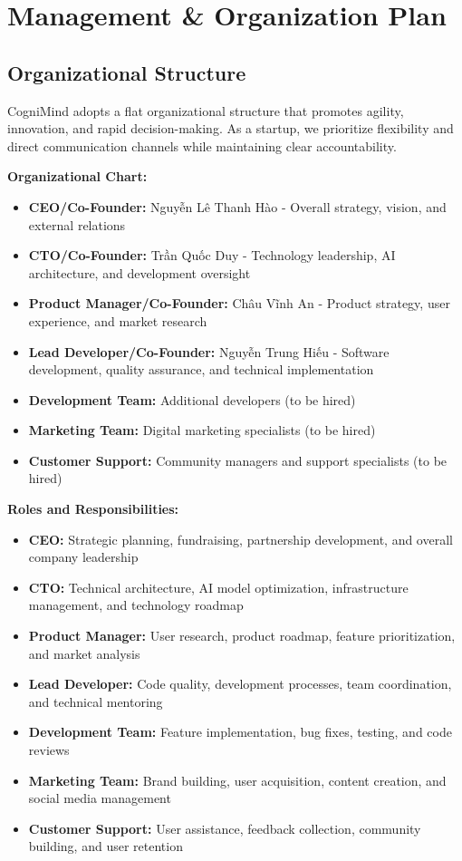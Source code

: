 \section{Management \& Organization Plan}

\subsection{Organizational Structure}
CogniMind adopts a flat organizational structure that promotes agility, innovation, and rapid decision-making. As a startup, we prioritize flexibility and direct communication channels while maintaining clear accountability.

\textbf{Organizational Chart:}
\begin{itemize}
    \item \textbf{CEO/Co-Founder:} Nguyễn Lê Thanh Hào - Overall strategy, vision, and external relations
    \item \textbf{CTO/Co-Founder:} Trần Quốc Duy - Technology leadership, AI architecture, and development oversight
    \item \textbf{Product Manager/Co-Founder:} Châu Vĩnh An - Product strategy, user experience, and market research
    \item \textbf{Lead Developer/Co-Founder:} Nguyễn Trung Hiếu - Software development, quality assurance, and technical implementation
    \item \textbf{Development Team:} Additional developers (to be hired)
    \item \textbf{Marketing Team:} Digital marketing specialists (to be hired)
    \item \textbf{Customer Support:} Community managers and support specialists (to be hired)
\end{itemize}

\textbf{Roles and Responsibilities:}
\begin{itemize}
    \item \textbf{CEO:} Strategic planning, fundraising, partnership development, and overall company leadership
    \item \textbf{CTO:} Technical architecture, AI model optimization, infrastructure management, and technology roadmap
    \item \textbf{Product Manager:} User research, product roadmap, feature prioritization, and market analysis
    \item \textbf{Lead Developer:} Code quality, development processes, team coordination, and technical mentoring
    \item \textbf{Development Team:} Feature implementation, bug fixes, testing, and code reviews
    \item \textbf{Marketing Team:} Brand building, user acquisition, content creation, and social media management
    \item \textbf{Customer Support:} User assistance, feedback collection, community building, and user retention
\end{itemize}

